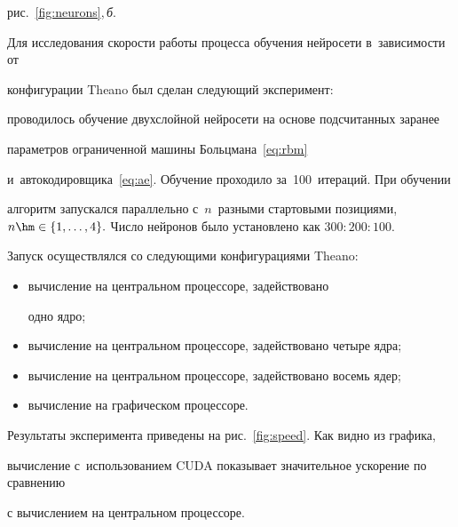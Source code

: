 рис.~\ref{fig:neurons},\,\textit{б}.





Для исследования скорости работы процесса обучения нейросети в~за\-ви\-си\-мости от 


конфигурации Theano был сделан следующий эксперимент:


проводилось обучение двухслойной нейросети на основе подсчитанных заранее 


параметров ограниченной машины Больцмана~\eqref{eq:rbm} 


и~автокодировщика~\eqref{eq:ae}. Обучение проходило за~100~итераций. При обучении 


алгоритм запускался параллельно с~$n$~разными стартовыми позициями, $n \hm\in 


\{1,\ldots,4\}.$ Число нейронов было установлено как $300:200:100$.


Запуск осуществлялся со следующими конфигурациями Theano:


\begin{itemize}


\item вычисление на центральном процессоре, задействовано


одно ядро;\\[-13pt]


\item вычисление на центральном процессоре, задействовано четыре ядра;\\[-13pt]


\item вычисление на центральном процессоре, задействовано восемь ядер;\\[-13pt]


\item вычисление на графическом процессоре.


\end{itemize}





Результаты эксперимента приведены на рис.~\ref{fig:speed}. Как видно из графика, 


вычисление с~использованием CUDA показывает значительное ускорение по сравнению 


с вычислением на центральном процессоре.






